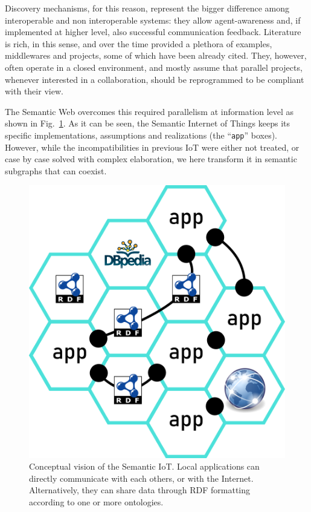 Discovery mechanisms, for this reason, represent the bigger difference among interoperable and non interoperable systems: they allow agent-awareness and, if implemented at higher level, also successful communication feedback. Literature is rich, in this sense, and over the time provided a plethora of examples, middlewares and projects, some of which have been already cited. They, however, often operate in a closed environment, and mostly assume that parallel projects, whenever interested in a collaboration, should be reprogrammed to be compliant with their view.

The Semantic Web overcomes this required parallelism at information level as shown in Fig.~\ref{fig:honeycomb}. As it can be seen, the Semantic Internet of Things keeps its specific implementations, assumptions and realizations (the ``\texttt{app}'' boxes). However, while the incompatibilities in previous IoT were either not treated, or case by case solved with complex elaboration, we here transform it in semantic subgraphs that can coexist.
\begin{figure}
\centering
\includegraphics[scale=0.55]{honeycomb.png} 
\caption{Conceptual vision of the Semantic IoT. Local applications can directly communicate with each others, or with the Internet. Alternatively, they can share data through RDF formatting according to one or more ontologies.}
\label{fig:honeycomb}
\end{figure}

